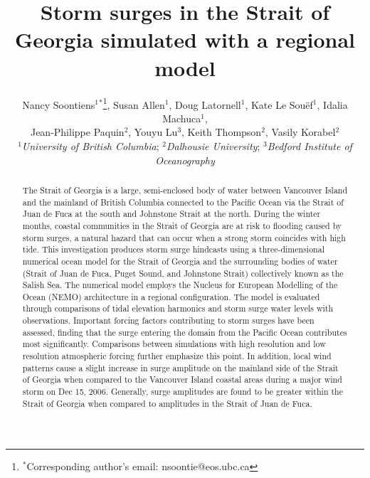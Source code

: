 \documentclass{tATO2e}
\begin{document}


\title{Storm surges in the Strait of Georgia simulated with a regional model}

\author{Nancy Soontiens$^{1}$$^{\ast}$\thanks{$^\ast$Corresponding author's email: nsoontie@eos.ubc.ca
\vspace{6pt}}, Susan Allen$^{1}$,  Doug Latornell$^{1}$,  Kate Le Sou\"{e}f$^{1}$, Idalia Machuca$^{1}$,\\ Jean-Philippe Paquin$^{2}$,
Youyu Lu$^{3}$, Keith Thompson$^{2}$, Vasily Korabel$^{2}$
\\\vspace{6pt}  $^{1}${\em{University of British Columbia}};
$^{2}${\em{Dalhousie University}};
$^{3}${\em{Bedford Institute of Oceanography}}\\ }

\maketitle

\begin{abstract}
The Strait of Georgia is a large, semi-enclosed body of water between Vancouver Island and the mainland of British Columbia connected to the Pacific Ocean via the Strait of Juan de Fuca at the south and Johnstone Strait at the north. During the winter months, coastal communities in the Strait of Georgia are at risk to flooding caused by storm surges, a natural hazard that can occur when a strong storm coincides with high tide. This investigation produces storm surge hindcasts using a three-dimensional numerical ocean model for the Strait of Georgia and the surrounding bodies of water (Strait of Juan de Fuca, Puget Sound, and Johnstone Strait) collectively known as the Salish Sea. The numerical model employs the Nucleus for European Modelling of the Ocean (NEMO) architecture in a regional configuration. The model is evaluated through comparisons of tidal elevation harmonics and storm surge water levels with observations. Important forcing factors contributing to storm surges have been assessed, finding that the surge entering the domain from the Pacific Ocean contributes most significantly. Comparisons between simulations with high resolution and low resolution atmospheric forcing further emphasize this point. In addition, local wind patterns cause a slight increase in surge amplitude on the mainland side of the Strait of Georgia when compared to the Vancouver Island coastal areas during a major wind storm on Dec 15, 2006. Generally, surge amplitudes are found to be greater within the Strait of Georgia when compared to amplitudes in the Strait of Juan de Fuca.
\end{abstract}
\end{document}
